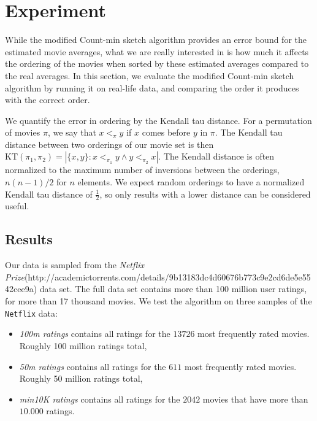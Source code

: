 \section{Experiment}
While the modified Count-min sketch algorithm provides an error bound for the
estimated movie averages, what we are really interested in is how much it
affects the ordering of the movies when sorted by these estimated averages
compared to the real averages. In this section, we evaluate the modified
Count-min sketch algorithm by running it on real-life data, and comparing the
order it produces with the correct order. 

We quantify the error in ordering by the Kendall tau distance. For a permutation
of movies $\pi$, we say that $x <_\pi y$ if $x$ comes before $y$ in $\pi$. The
Kendall tau distance between two orderings of our movie set is then $\mathrm{KT}
\left(\pi_1,\pi_2\right) = \left|\{x,y\}: x <_{\pi_1} y \wedge y <_{\pi_2}
x\right|$. The Kendall distance is often normalized to the maximum number of
inversions between the orderings, $n(n-1)/2$ for $n$ elements. We expect random
orderings to have a normalized Kendall tau distance of $\frac{1}{2}$, so
only results with a lower distance can be considered useful.

\subsection{Results}
Our data is sampled from the \textit{Netflix
Prize}(http://academictorrents.com/details/9b13183dc4d60676b773c9e2cd6de5e5542cee9a) data set.
The full data set contains more than 100 million user ratings, for more than 17
thousand movies.
We test the algorithm on three samples of the \texttt{Netflix} data:
\begin{itemize}
	\item \textit{100m ratings} contains all ratings for the $13726$ most
		frequently rated movies. Roughly 100 million ratings total,
	\item \textit{50m ratings} contains all ratings for the $611$ most
		frequently rated movies. Roughly 50 million ratings total,
	\item \textit{min10K ratings} contains all ratings for the $2042$ movies that have more
		than $10.000$ ratings.


\end{itemize}

